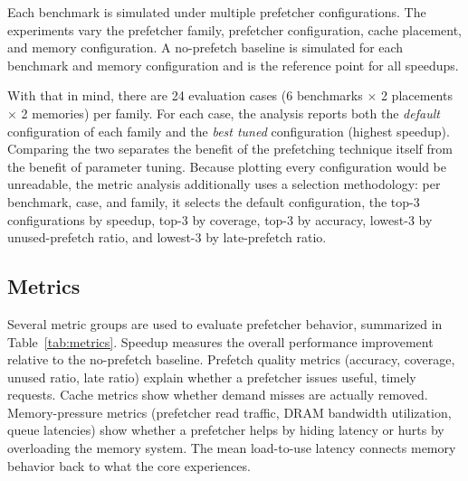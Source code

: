 \documentclass[12pt, letterpaper]{article}
\begin{document}
Each benchmark is simulated under multiple prefetcher configurations. The experiments vary the prefetcher family, prefetcher configuration, cache placement, and memory configuration. A no-prefetch baseline is simulated for each benchmark and memory configuration and is the reference point for all speedups.


\noindent With that in mind, there are 24 evaluation cases (6 benchmarks $\times$ 2 placements $\times$ 2 memories) per family. For each case, the analysis reports both the \emph{default} configuration of each family and the \emph{best tuned} configuration (highest speedup). Comparing the two separates the benefit of the prefetching technique itself from the benefit of parameter tuning. Because plotting every configuration would be unreadable, the metric analysis additionally uses a selection methodology: per benchmark, case, and family, it selects the default configuration, the top-3 configurations by speedup, top-3 by coverage, top-3 by accuracy, lowest-3 by unused-prefetch ratio, and lowest-3 by late-prefetch ratio.

\subsection{Metrics}
\label{sec:eval:metric}

Several metric groups are used to evaluate prefetcher behavior, summarized in Table~\ref{tab:metrics}. Speedup measures the overall performance improvement relative to the no-prefetch baseline. Prefetch quality metrics (accuracy, coverage, unused ratio, late ratio) explain whether a prefetcher issues useful, timely requests. Cache metrics show whether demand misses are actually removed. Memory-pressure metrics (prefetcher read traffic, DRAM bandwidth utilization, queue latencies) show whether a prefetcher helps by hiding latency or hurts by overloading the memory system. The mean load-to-use latency connects memory behavior back to what the core experiences.
\end{document}

